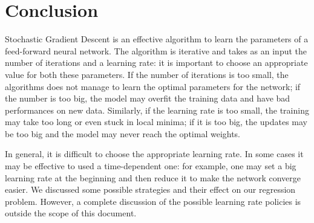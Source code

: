 \section{Conclusion}
\label{sec:conclusion}

Stochastic Gradient Descent is an effective algorithm to learn the parameters of a feed-forward neural network.
The algorithm is iterative and takes as an input the number of iterations and a learning rate:
it is important to choose an appropriate value for both these parameters.
If the number of iterations is too small, the algorithms does not manage to learn the optimal parameters for the network;
if the number is too big, the model may overfit the training data and have bad performances on new data.
Similarly, if the learning rate is too small, the training may take too long or even stuck in local minima;
if it is too big, the updates may be too big and the model may never reach the optimal weights.

In general, it is difficult to choose the appropriate learning rate.
In some cases it may be effective to used a time-dependent one:
for example, one may set a big learning rate at the beginning and then reduce it to make the network converge easier.
We discussed some possible strategies and their effect on our regression problem.
However, a complete discussion of the possible learning rate policies is outside the scope of this document.
